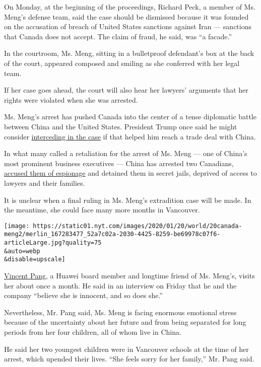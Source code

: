 On Monday, at the beginning of the proceedings, Richard Peck, a member
of Ms. Meng's defense team, said the case should be dismissed because it
was founded on the accusation of breach of United States sanctions
against Iran --- sanctions that Canada does not accept. The claim of
fraud, he said, was ``a facade.''

In the courtroom, Ms. Meng, sitting in a bulletproof defendant's box at
the back of the court, appeared composed and smiling as she conferred
with her legal team.

If her case goes ahead, the court will also hear her lawyers' arguments
that her rights were violated when she was arrested.

Ms. Meng's arrest has pushed Canada into the center of a tense
diplomatic battle between China and the United States. President Trump
once said he might consider
\href{https://www.nytimes.com/2018/12/12/us/politics/trump-meng-wanzhou-huawei-extradition.html?module=inline}{interceding
in the case} if that helped him reach a trade deal with China.

In what many called a retaliation for the arrest of Ms. Meng --- one of
China's most prominent business executives --- China has arrested two
Canadians,
\href{https://www.nytimes.com/2019/03/04/world/asia/china-canada-michael-kovrig-huawei.html?module=inline}{accused
them of espionage} and detained them in secret jails, deprived of access
to lawyers and their families.

It is unclear when a final ruling in Ms. Meng's extradition case will be
made. In the meantime, she could face many more months in Vancouver.

\texttt{[image: https://static01.nyt.com/images/2020/01/20/world/20canada-meng2/merlin\_167283477\_52a7c02a-2030-4425-8259-be69978c07f6-articleLarge.jpg?quality=75\\\&auto=webp\\\&disable=upscale]}

\href{https://huawei.eu/profile/vincent-peng}{Vincent Pang}, a Huawei
board member and longtime friend of Ms. Meng's, visits her about once a
month. He said in an interview on Friday that he and the company
``believe she is innocent, and so does she.''

Nevertheless, Mr. Pang said, Ms. Meng is facing enormous emotional
stress because of the uncertainty about her future and from being
separated for long periods from her four children, all of whom live in
China.

He said her two youngest children were in Vancouver schools at the time
of her arrest, which upended their lives. ``She feels sorry for her
family,'' Mr. Pang said.

